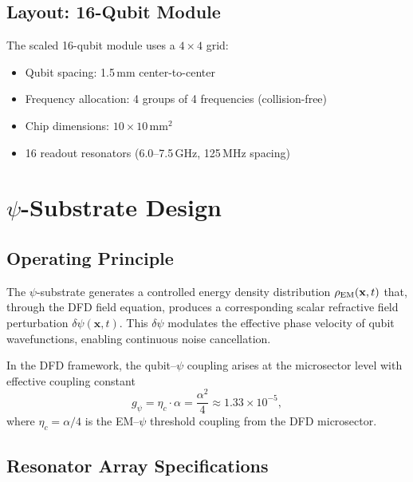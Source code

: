 \documentclass[11pt,letterpaper]{article}
\begin{document}
\subsection{Layout: 16-Qubit Module}

The scaled 16-qubit module uses a $4 \times 4$ grid:
\begin{itemize}
\item Qubit spacing: 1.5\,mm center-to-center
\item Frequency allocation: 4 groups of 4 frequencies (collision-free)
\item Chip dimensions: $10 \times 10$\,mm$^2$
\item 16 readout resonators (6.0--7.5\,GHz, 125\,MHz spacing)
\end{itemize}

\section{$\psi$-Substrate Design}

\subsection{Operating Principle}

The $\psi$-substrate generates a controlled energy density distribution
$\rho_{\rm EM}(\mathbf{x},t)$ that, through the DFD field equation,
produces a corresponding scalar refractive field perturbation
$\delta\psi(\mathbf{x},t)$. This $\delta\psi$ modulates the effective
phase velocity of qubit wavefunctions, enabling continuous noise
cancellation.

In the DFD framework, the qubit--$\psi$ coupling arises at the
microsector level with effective coupling constant
\begin{equation}
g_{\psi} = \eta_c \cdot \alpha = \frac{\alpha^2}{4}
\approx 1.33 \times 10^{-5},
\end{equation}
where $\eta_c = \alpha/4$ is the EM--$\psi$ threshold coupling from the
DFD microsector.

\subsection{Resonator Array Specifications}
\end{document}
